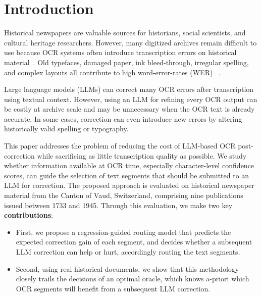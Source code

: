 \documentclass[sigconf]{acmart}
\begin{document}




\maketitle

\section{Introduction}
Historical newspapers are valuable sources for historians, social scientists, and cultural heritage researchers. However, many digitized archives remain difficult to use because OCR systems often introduce transcription errors on historical material~\cite{piryani2025evaluating}. Old typefaces, damaged paper, ink bleed-through, irregular spelling, and complex layouts all contribute to high word-error-rates (WER) ~\cite{holley2009good,alex2012digitised}.

Large language models (LLMs) can correct many OCR errors after transcription using textual context. However, using an LLM for refining every OCR output can be costly at archive scale and may be unnecessary when the OCR text is already accurate. In some cases, correction can even introduce new errors by altering historically valid spelling or typography.

This paper addresses the problem of reducing the cost of LLM-based OCR post-correction while sacrificing as little transcription quality as possible. We study whether information available at OCR time, especially character-level confidence scores, can guide the selection of text segments that should be submitted to an LLM for correction. The proposed approach is evaluated on historical newspaper material from the Canton of Vaud, Switzerland, comprising nine publications issued between 1733 and 1945. Through this evaluation, we make two key \textbf{contributions}:
\begin{itemize}
    \item First, 
     we propose a
    regression-guided routing model that predicts the expected correction gain of each segment, and decides whether a subsequent LLM correction can help or hurt, accordingly routing the text segments.
    \item Second, using real historical documents, we show that this methodology closely trails the decisions of an optimal oracle,
    which knows a-priori which OCR segments will benefit from a subsequent LLM correction.
\end{itemize}
\end{document}
